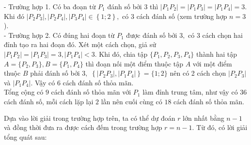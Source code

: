 \begin{bt}
{\begin{itemize}
			- Trường hợp 1. Có ba đoạn từ $P_1$ đánh số bởi 3 thì $|P_1P_2|=|P_1P_3|=|P_1P_4|=3.$ Khi đó $|P_2P_3|, |P_2P_4|, |P_3P_4|\in \left\lbrace 1;2\right\rbrace ,$ có 3 cách đánh số (xem trường hợp $n=3$).\\
			- Trường hợp 2. Có đúng hai đoạn từ $P_1$ được đánh số bởi $3,$ có $3$ cách chọn hai đỉnh tạo ra hai đoạn đó. Xét một cách chọn, giả sử $|P_1P_2|=|P_1P_3|=3, |P_1P_4|<3.$ Khi đó, chia tập $\{P_1, P_2, P_3, P_4\}$ thành hai tập $A=\{P_2,P_3\}, B=\{P_1,P_4\}$ thì đoạn nối một điểm thuộc tập $A$ với một điểm thuộc $B$ phải đánh số bởi $3,$ $\left\lbrace |P_2P_3|, |P_1P_4|\right\rbrace =\{1;2\}$ nên có 2 cách chọn  $|P_2P_3|$ và $ |P_1P_4|.$ Vậy có 6 cách đánh số thỏa mãn.\\
			Tổng cộng có $9$ cách đánh số thỏa mãn với $P_1$ làm đỉnh trung tâm, như vậy có $36$ cách đánh số, mỗi cách lặp lại $2$ lần nên cuối cùng có $18$ cách đánh số thỏa mãn.
		\end{itemize}
		Dựa vào lời giải trong trường hợp trên, ta có thể dự đoán $r$ lớn nhất bằng $n-1$ và đồng thời đưa ra được cách đếm trong trường hợp $r=n-1.$ Từ đó, có lời giải tổng quát sau:
		
}
\end{bt}
